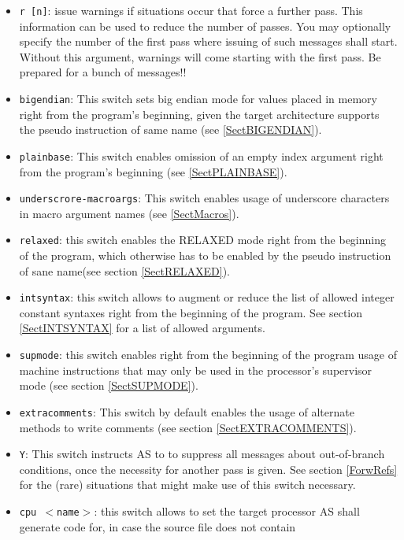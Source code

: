 \documentclass[12pt,twoside]{report}
\newcommand{\tty}[1]{{\tt #1}}
\newcommand{\asname}{{AS}}
\begin{document}
\begin{itemize}
{      processor of \asname{} shall be used.}
\item{\tty{r [n]}: issue warnings if situations occur that force a further
      pass. This information can be used to reduce the number of
      passes.  You may optionally specify the number of the
      first pass where issuing of such messages shall start.
      Without this argument, warnings will come starting with
      the first pass.  Be prepared for a bunch of messages!!}
\item{\tty{bigendian}: This switch sets big endian mode for values placed
      in memory right from the program's beginning, given the target
      architecture supports the pseudo instruction of same name (see
      \ref{SectBIGENDIAN}).}
\item{\tty{plainbase}: This switch enables omission of an empty index
      argument right from the program's beginning (see \ref{SectPLAINBASE}).}
\item{\tty{underscrore-macroargs}: This switch enables usage of underscore characters
      in macro argument names (see \ref{SectMacros}).}
\item{\tty{relaxed}: this switch enables the RELAXED mode right from the
      beginning of the program, which otherwise has to be enabled by the
      pseudo instruction of sane name(see section \ref{SectRELAXED}).}
\item{\tty{intsyntax}: this switch allows to augment or reduce the list of
      allowed integer constant syntaxes right from the beginning of the
      program.  See section \ref{SectINTSYNTAX} for a list of allowed
      arguments.}
\item{\tty{supmode}: this switch enables right from the beginning of the
      program usage of machine instructions that may only be used in the
      processor's supervisor mode (see section \ref{SectSUPMODE}).}
\item{\tty{extracomments}: This switch by default enables the usage of
      alternate methods to write comments (see section \ref{SectEXTRACOMMENTS}).}
\item{\tty{Y}: This switch instructs \asname{} to to suppress all messages about
      out-of-branch conditions, once the necessity for another pass is given.
      See section \ref{ForwRefs} for the (rare) situations that might make
      use of this switch necessary.}
\item{\tty{cpu $<$name$>$}: this switch allows to set the target processor
      \asname{} shall generate code for, in case the source file does not contain
}
\end{itemize}
\end{document}
